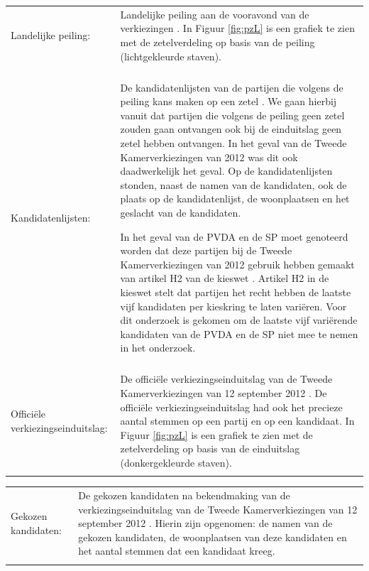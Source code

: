 \noindent\begin{tabularx}{\textwidth}{LI}
Landelijke peiling:  & Landelijke peiling aan de vooravond van de verkiezingen \citep{IPSOS}. In Figuur \ref{fig:pzL} is een grafiek te zien met de zetelverdeling  op basis van de peiling (lichtgekleurde staven). \\
  \\
Kandidatenlijsten: & De kandidatenlijsten van de partijen die volgens de peiling kans maken op een zetel \citep{Kiesraad_kandidatenlijsten}. We gaan hierbij vanuit dat partijen die volgens de peiling geen zetel zouden gaan ontvangen ook bij de einduitslag geen zetel hebben ontvangen. In het geval van de Tweede Kamerverkiezingen van 2012 was dit ook daadwerkelijk het geval. Op de kandidatenlijsten stonden, naast de namen van de kandidaten, ook de plaats op de kandidatenlijst, de woonplaatsen en het geslacht van de kandidaten.

In het geval van de PVDA en de SP moet genoteerd worden dat deze partijen bij de Tweede Kamerverkiezingen van 2012 gebruik hebben gemaakt van artikel H2 van de kieswet \citep{kieswetje}. Artikel H2 in de kieswet stelt dat partijen het recht hebben de laatste vijf kandidaten per kieskring te laten vari\"{e}ren. Voor dit onderzoek is gekomen om de laatste vijf vari\"{e}rende kandidaten van de PVDA en de SP niet mee te nemen in het onderzoek. \\
\\
Offici\"{e}le verkiezingseinduitslag: & De officiële verkiezingseinduitslag van de Tweede Kamerverkiezingen van 12 september 2012 \citep{Kiesraad_databank}. De officiële verkiezingseinduitslag had ook het precieze aantal stemmen op een partij en op een kandidaat.  In Figuur \ref{fig:pzL} is een grafiek te zien met de zetelverdeling  op basis van de einduitslag (donkergekleurde staven).  \\
\\  
\end{tabularx}

\noindent\begin{tabularx}{\textwidth}{LI}
Gekozen kandidaten:  & De gekozen kandidaten na bekendmaking van de verkiezingseinduitslag van de Tweede Kamerverkiezingen van 12 september 2012 \citep{Kiesraad_uitslag}. Hierin zijn opgenomen: de namen van de gekozen kandidaten, de woonplaatsen van deze kandidaten en het aantal stemmen dat een kandidaat kreeg. \\
  \\
\end{tabularx}

